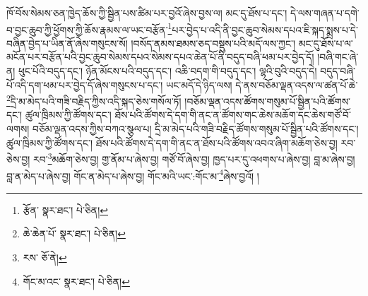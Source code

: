 ཁོ་བོས་སེམས་ཅན་ཁྱེད་ཆོས་ཀྱི་སྦྱིན་པས་ཚིམ་པར་བྱའོ་ཞེས་བྱས་ལ། མང་དུ་ཐོས་པ་དང་། དེ་ལས་གཞན་པ་དགེ་བ་བྱང་ཆུབ་ཀྱི་ཕྱོགས་ཀྱི་ཆོས་རྣམས་ལ་ཡང་བརྩོན་\footnote{རྩོན་  སྣར་ཐང་།  པེ་ཅིན། }པར་བྱེད་པ་འདི་ནི་བྱང་ཆུབ་སེམས་དཔའ་ཇི་སྐད་སྨྲས་པ་དེ་བཞིན་བྱེད་པ་ཡིན་ནོ་ཞེས་གསུངས་སོ། །བསོད་ནམས་ཐམས་ཅད་བསྡུས་པའི་མདོ་ལས་ཀྱང་། མང་དུ་ཐོས་པ་ལ་མངོན་པར་བརྩོན་པའི་བྱང་ཆུབ་སེམས་དཔའ་སེམས་དཔའ་ཆེན་པོ་ནི་བདུད་བཞི་ཕམ་པར་བྱེད་དོ། །བཞི་གང་ཞེ་ན། ཕུང་པོའི་བདུད་དང་། ཉོན་མོངས་པའི་བདུད་དང་། འཆི་བདག་གི་བདུད་དང་། ལྷའི་བུའི་བདུད་དེ། བདུད་བཞི་པོ་འདི་དག་ཕམ་པར་བྱེད་དོ་ཞེས་གསུངས་པ་དང་། ཡང་མདོ་དེ་ཉིད་ལས། དེ་ནས་བཅོམ་ལྡན་འདས་ལ་ཚན་པོ་ཆེ་\footnote{ཆེ་ཆེན་པོ་  སྣར་ཐང་།  པེ་ཅིན། }དྲི་མ་མེད་པའི་གཟི་བརྗིད་ཀྱིས་འདི་སྐད་ཅེས་གསོལ་ཏོ། །བཅོམ་ལྡན་འདས་ཚོགས་གསུམ་པོ་སྦྱིན་པའི་ཚོགས་དང་། ཚུལ་ཁྲིམས་ཀྱི་ཚོགས་དང་། ཐོས་པའི་ཚོགས་དེ་དག་གི་ནང་ན་ཚོགས་གང་ཆེས་མཆོག་དང་ཆེས་གཙོ་བོ་ལགས། བཅོམ་ལྡན་འདས་ཀྱིས་བཀའ་སྩལ་པ། དྲི་མ་མེད་པའི་གཟི་བརྗིད་ཚོགས་གསུམ་པོ་སྦྱིན་པའི་ཚོགས་དང་། ཚུལ་ཁྲིམས་ཀྱི་ཚོགས་དང་། ཐོས་པའི་ཚོགས་དེ་དག་གི་ནང་ན་ཐོས་པའི་ཚོགས་འབའ་ཞིག་མཆོག་ཅེས་བྱ། རབ་ཅེས་བྱ། རབ་\footnote{རས་  ཅོ་ནེ། }མཆོག་ཅེས་བྱ། གྱ་ནོམ་པ་ཞེས་བྱ། གཙོ་བོ་ཞེས་བྱ། ཁྱད་པར་དུ་འཕགས་པ་ཞེས་བྱ། བླ་མ་ཞེས་བྱ། བླ་ན་མེད་པ་ཞེས་བྱ། གོང་ན་མེད་པ་ཞེས་བྱ། གོང་མའི་ཡང་:གོང་མ་\footnote{གོང་མ་འང་  སྣར་ཐང་།  པེ་ཅིན། }ཞེས་བྱའོ། །

